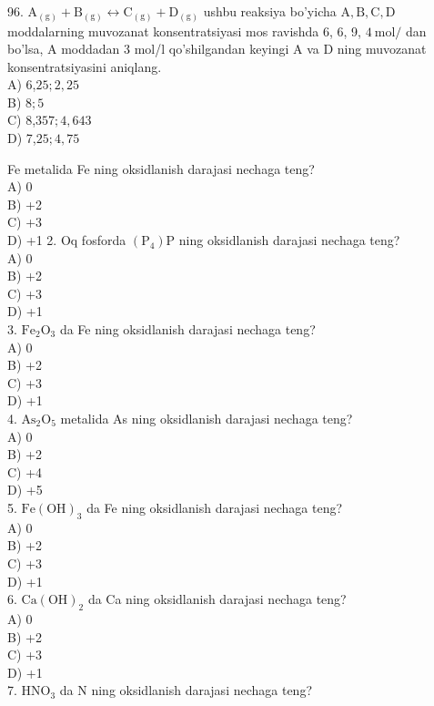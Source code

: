 96. $\mathrm{A}_{(\mathrm{g})}+\mathrm{B}_{(\mathrm{g})} \leftrightarrow \mathrm{C}_{(\mathrm{g})}+\mathrm{D}_{(\mathrm{g})}$ ushbu reaksiya bo'yicha $\mathrm{A}, \mathrm{B}, \mathrm{C}, \mathrm{D}$ moddalarning muvozanat konsentratsiyasi mos ravishda 6, 6, 9, $4 \mathrm{~mol} /$ dan bo'lsa, A moddadan 3 mol/l qo'shilgandan keyingi A va D ning muvozanat konsentratsiyasini aniqlang.\\
A) 6,$25 ; 2,25$\\
B) $8 ; 5$\\
C) 8,$357 ; 4,643$\\
D) 7,$25 ; 4,75$\\
  \item Fe metalida Fe ning oksidlanish darajasi nechaga teng?\\
A) 0\\
B) +2\\
C) +3\\
D) +1
2. Oq fosforda $\left(\mathrm{P}_{4}\right) \mathrm{P}$ ning oksidlanish darajasi nechaga teng?\\
A) 0\\
B) +2\\
C) +3\\
D) +1\\
3. $\mathrm{Fe}_{2} \mathrm{O}_{3}$ da Fe ning oksidlanish darajasi nechaga teng?\\
A) 0\\
B) +2\\
C) +3\\
D) +1\\
4. $\mathrm{As}_{2} \mathrm{O}_{5}$ metalida As ning oksidlanish darajasi nechaga teng?\\
A) 0\\
B) +2\\
C) +4\\
D) +5\\
5. $\mathrm{Fe}(\mathrm{OH})_{3}$ da Fe ning oksidlanish darajasi nechaga teng?\\
A) 0\\
B) +2\\
C) +3\\
D) +1\\
6. $\mathrm{Ca}(\mathrm{OH})_{2}$ da Ca ning oksidlanish darajasi nechaga teng?\\
A) 0\\
B) +2\\
C) +3\\
D) +1\\
7. $\mathrm{HNO}_{3}$ da N ning oksidlanish darajasi nechaga teng?\\

